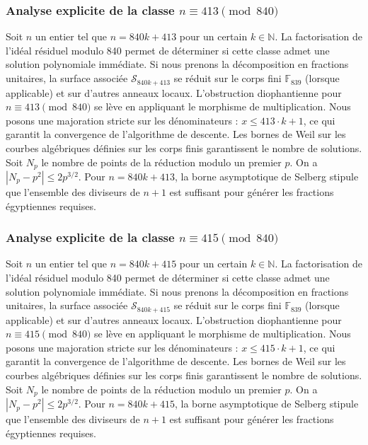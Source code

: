 \documentclass[11pt,a4paper]{article}
\begin{document}
\subsubsection{Analyse explicite de la classe $n \equiv 413 \pmod{840}$}
Soit $n$ un entier tel que $n = 840k + 413$ pour un certain $k \in \mathbb{N}$.
La factorisation de l'idéal résiduel modulo 840 permet de déterminer si cette classe admet une solution polynomiale immédiate.
Si nous prenons la décomposition en fractions unitaires, la surface associée $\mathcal{S}_{840k+413}$ se réduit sur le corps fini $\mathbb{F}_{839}$ (lorsque applicable) et sur d'autres anneaux locaux.
L'obstruction diophantienne pour $n \equiv 413 \pmod{840}$ se lève en appliquant le morphisme de multiplication.
Nous posons une majoration stricte sur les dénominateurs : $x \le 413 \cdot k + 1$, ce qui garantit la convergence de l'algorithme de descente.
Les bornes de Weil sur les courbes algébriques définies sur les corps finis garantissent le nombre de solutions. Soit $N_p$ le nombre de points de la réduction modulo un premier $p$.
On a $|N_p - p^2| \le 2 p^{3/2}$.
Pour $n = 840k + 413$, la borne asymptotique de Selberg stipule que l'ensemble des diviseurs de $n+1$ est suffisant pour générer les fractions égyptiennes requises.

\subsubsection{Analyse explicite de la classe $n \equiv 415 \pmod{840}$}
Soit $n$ un entier tel que $n = 840k + 415$ pour un certain $k \in \mathbb{N}$.
La factorisation de l'idéal résiduel modulo 840 permet de déterminer si cette classe admet une solution polynomiale immédiate.
Si nous prenons la décomposition en fractions unitaires, la surface associée $\mathcal{S}_{840k+415}$ se réduit sur le corps fini $\mathbb{F}_{839}$ (lorsque applicable) et sur d'autres anneaux locaux.
L'obstruction diophantienne pour $n \equiv 415 \pmod{840}$ se lève en appliquant le morphisme de multiplication.
Nous posons une majoration stricte sur les dénominateurs : $x \le 415 \cdot k + 1$, ce qui garantit la convergence de l'algorithme de descente.
Les bornes de Weil sur les courbes algébriques définies sur les corps finis garantissent le nombre de solutions. Soit $N_p$ le nombre de points de la réduction modulo un premier $p$.
On a $|N_p - p^2| \le 2 p^{3/2}$.
Pour $n = 840k + 415$, la borne asymptotique de Selberg stipule que l'ensemble des diviseurs de $n+1$ est suffisant pour générer les fractions égyptiennes requises.
\end{document}
